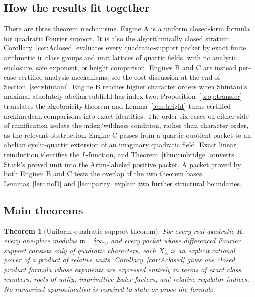 \documentclass[11pt]{article}
\newtheorem{theorem}{Theorem}
\begin{document}
\subsection*{How the results fit together}

There are three theorem mechanisms.  Engine A is a uniform closed-form
formula for quadratic Fourier support.  It is also the
algorithmically closed stratum: Corollary~\ref{cor:Aclosed} evaluates
every quadratic-support packet by exact finite arithmetic in class
groups and unit lattices of quartic fields, with no analytic
enclosure, safe exponent, or height comparison.  Engines B and C are
instead per-case certified-analysis mechanisms; see the cost
discussion at the end of Section~\ref{sec:shintani}.  Engine B reaches higher
character orders when Shintani's maximal absolutely abelian subfield
has index two: Proposition~\ref{prop:transfer} translates the
algebraicity theorem and Lemma~\ref{lem:height} turns certified
archimedean comparisons into exact identities.  The order-six cases
on either side of ramification isolate the index/wildness condition,
rather than character order, as the relevant obstruction.  Engine C
passes from a quartic quotient packet to an abelian cyclic-quartic
extension of an imaginary quadratic field.  Exact linear reinduction
identifies the \(L\)-function, and
Theorem~\ref{thm:cmbridge} converts Stark's proved unit into the
Artin-labeled positive packet.  A packet proved by both Engines B and
C tests the overlap of the two theorem bases.
Lemmas~\ref{lem:noD} and \ref{lem:parity} explain two further
structural boundaries.

\subsection*{Main theorems}

\begin{theorem}[Uniform quadratic-support theorem]\label{thm:A}
For every real quadratic \(K\), every one-place modulus
\(\mathfrak m=\mathfrak f\infty_2\), and every packet whose
differenced Fourier support consists only of quadratic characters,
each \(X_A\) is an explicit rational power of a product of relative
units.  Corollary~\ref{cor:Aclosed} gives one closed product formula
whose exponents are expressed entirely in terms of exact class
numbers, roots of unity, imprimitive Euler factors, and
relative-regulator indices.  No numerical approximation is required
to state or prove the formula.
\end{theorem}
\end{document}
